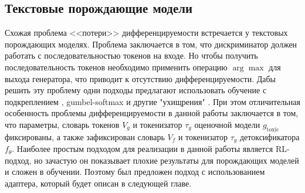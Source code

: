\subsection{Текстовые порождающие модели}
Схожая проблема <<потери>> дифференцируемости встречается у текстовых порождающих моделях. 
Проблема заключается в том, что дискриминатор должен работать с последовательностью токенов на входе. 
Но чтобы получить последовательность токенов необходимо применить операцию $\arg\max$ для выхода генератора, что приводит к отсутствию дифференцируемости. 
Дабы решить эту проблему одни подходы предлагают использовать обучение с подкреплением \cite{Yu_Zhang_Wang_Yu_2017}, gumbel-softmax \cite{kusner2016gans} и другие "ухищрения" \cite{gan-wo-rl, gan-bert}.
При этом отличительная особенность проблемы дифференцируемости в данной работы заключается в том, что параметры, словарь токенов $V_{g}$ и токенизатор $\tau_{g}$ оценочной модели $g_{\text{toxic}}$ фиксированы, а также зафиксирован словарь $V_{f}$ и токенизатор $\tau_{g}$ детоксификатора $f_{\theta}$. 
Наиболее простым подходом для реализации в данной работы является RL-подход, но зачастую он показывает плохие результаты для порождающих моделей и сложен в обучении.
Поэтому был предложен подход с использованием адаптера, который будет описан в следующей главе. 

